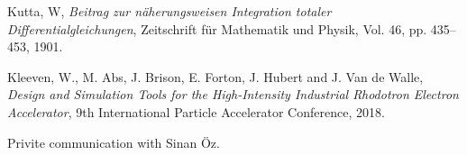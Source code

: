 \documentclass[a4paper,oneside,12pt]{report}
\numberwithin{equation}{chapter}
\begin{document}
\begin{thebibliography}{9}
    Kutta, W, 
    \emph{Beitrag zur näherungsweisen Integration totaler Differentialgleichungen}, 
    Zeitschrift für Mathematik und Physik, 
    Vol. 46,
    pp. 435–453,
    1901.

    Kleeven, W., M. Abs, J. Brison, E. Forton, J. Hubert and J. Van de Walle,
    \emph{Design and Simulation Tools for the High-Intensity Industrial Rhodotron Electron Accelerator},
    9th International Particle Accelerator Conference,
    2018.
    
    Privite communication with Sinan Öz.


\end{thebibliography}

\end{document}

